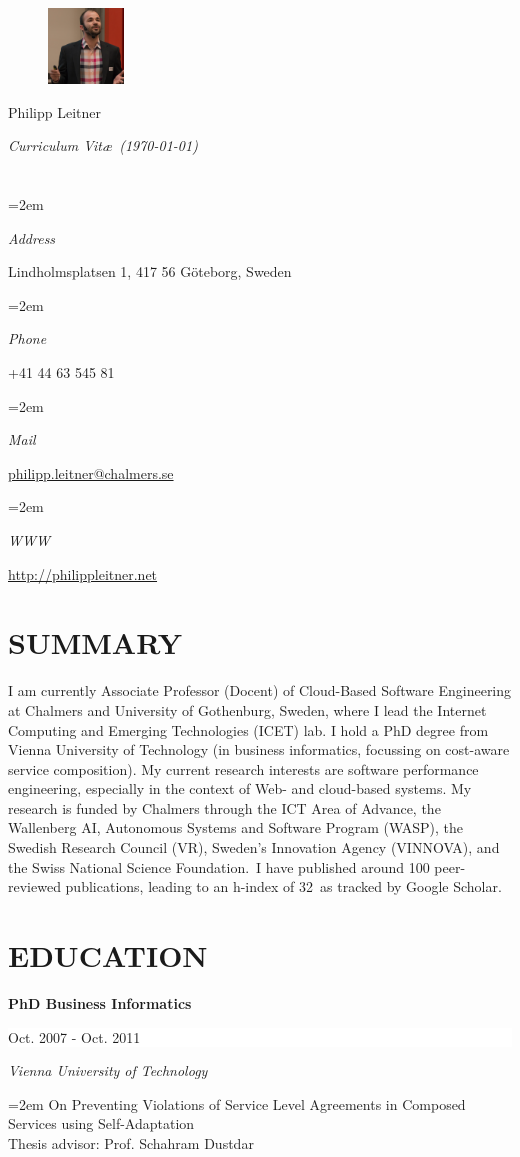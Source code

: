 \documentclass[paper=letter,fontsize=11pt]{scrartcl} %
\newlength{\spacebox}
\newcommand{\sepspace}{\vspace*{1em}}		%
\newcommand{\MyName}[1]{ %
		\Huge \usefont{OT1}{phv}{b}{n} \hfill #1
		\par \normalsize \normalfont}
\newcommand{\MySlogan}[1]{ %
		\large \usefont{OT1}{phv}{m}{n}\hfill \textit{#1}
		\par \normalsize \normalfont}
\newcommand{\NewPart}[2]{\section*{\uppercase{#1} #2}}
\newcommand{\PersonalEntry}[2]{
		\noindent\hangindent=2em\hangafter=0 %
		\parbox{\spacebox}{        %
		\textit{#1}}		       %
		\hspace{1.5em} #2 \par}    %
\newcommand{\EducationEntry}[4]{
		\noindent \textbf{#1} \hfill      %
		\colorbox{White}{%
			\parbox{10em}{%
			\hfill\color{Black}#2}} \par  %
		\noindent \textit{#3} \par        %
		\noindent\hangindent=2em\hangafter=0 \small #4 %
		\normalsize \par}
\begin{document}

\begin{figure}
	\vspace*{-2em}
		\includegraphics[width=0.18\textwidth]{profile.png}
\end{figure}

\MyName{Philipp Leitner}
\MySlogan{Curriculum Vit\ae\ (\today)}

\sepspace

\NewPart{}{}

\PersonalEntry{Address}{Lindholmsplatsen 1,
  417 56 Göteborg, Sweden}
\PersonalEntry{Phone}{+41 44 63 545 81}
\PersonalEntry{Mail}{\href{mailto:philipp.leitner@chalmers.se}{philipp.leitner@chalmers.se}}
\PersonalEntry{WWW}{\href{http://philippleitner.net}{http://philippleitner.net}}

\NewPart{Summary}{}
I am currently Associate Professor (Docent) of Cloud-Based Software Engineering at Chalmers and University of Gothenburg, Sweden, where I lead the Internet Computing and Emerging Technologies (ICET) lab. I hold a PhD degree from Vienna University of Technology (in business informatics, focussing on cost-aware service composition). My current research interests are software performance engineering, especially in the context of Web- and cloud-based systems. My research is funded by Chalmers through the ICT Area of Advance, the Wallenberg AI, Autonomous Systems and Software Program (WASP), the Swedish Research Council (VR), Sweden's Innovation Agency (VINNOVA),
and the Swiss National Science Foundation. I have published around 100 peer-reviewed publications, leading to an h-index of 32 as tracked by Google Scholar.


\NewPart{Education}{}

\EducationEntry{PhD Business Informatics}{Oct. 2007 - Oct. 2011}{Vienna
University of Technology}{On Preventing Violations of Service Level Agreements in Composed Services using Self-Adaptation\\
Thesis advisor: Prof. Schahram Dustdar}
\sepspace
\end{document}

